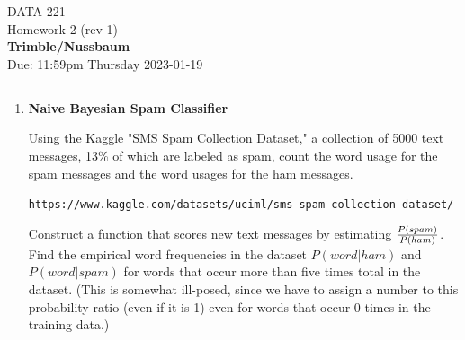 \documentclass[12pt]{book}
\theoremstyle{definition}
\begin{document}
\begin{center}
{\Large DATA 221 \\  Homework 2  (rev 1)}\\
\textbf{ Trimble/Nussbaum}\\ %
Due: 11:59pm  Thursday 2023-01-19 
\end{center}

\vspace{0.2 cm}

\subsection*{   }

\begin{enumerate}

%


\item


\textbf{Naive Bayesian Spam Classifier}

Using the Kaggle "SMS Spam Collection Dataset," a collection of 5000 text messages, 13\% of which are labeled as spam, count the word usage for the spam messages and the word usages for the ham messages.

\texttt{https://www.kaggle.com/datasets/uciml/sms-spam-collection-dataset/}

Construct a function that scores new text messages by estimating $ {P (spam ) \over P(ham) } $.  Find the empirical word frequencies in the dataset $P (word | ham)$ and $P( word | spam ) $ 
for words that occur more than five times total in the dataset.
(This is somewhat ill-posed, since we have to assign a number to this probability ratio (even if it is 1) even for words that occur 0 times in the training data.)


\end{enumerate}
\end{document}
